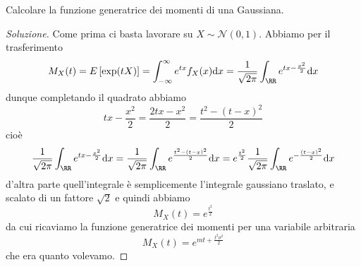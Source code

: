 \documentclass[11pt]{scrartcl}
\newcommand{\dif}{\text{d}}
\begin{document}
	\begin{example}
		Calcolare la funzione generatrice dei momenti di una Gaussiana. 
	\end{example}
	\begin{proof}[Soluzione]
		Come prima ci basta lavorare su $X\sim \mathcal{N}(0,1)$. Abbiamo per il trasferimento
		$$M_X(t)=E\left[\exp(tX)\right]=\int_{-\infty}^\infty e^{tx}f_X(x)\dif x=\frac{1}{\sqrt{2\pi}}\int_{\RR}e^{tx-\frac{x^2}{2}}\dif x$$
		dunque completando il quadrato abbiamo
		$$tx-\frac{x^2}{2}=\frac{2tx-x^2}{2}=\frac{t^2-(t-x)^2}{2}$$
		cioè
		$$\frac{1}{\sqrt{2\pi}}\int_{\RR}e^{tx-\frac{x^2}{2}}\dif x=\frac{1}{\sqrt{2\pi}}\int_{\RR}e^{\frac{t^2-(t-x)^2}{2}}\dif x=e^{\frac{t^2}{2}}\frac{1}{\sqrt{2\pi}}\int_{\RR}e^{-\frac{(t-x)^2}{2}}\dif x$$
		d'altra parte quell'integrale è semplicemente l'integrale gaussiano traslato, e scalato di un fattore $\sqrt{2}$ e quindi abbiamo
		$$M_X(t)=e^{\frac{t^2}{2}}$$
		da cui ricaviamo la funzione generatrice dei momenti per una variabile arbitraria
		$$M_X(t)=e^{mt+\frac{t^2\sigma^2}{2}}$$
		che era quanto volevamo.
	\end{proof}
\end{document}
